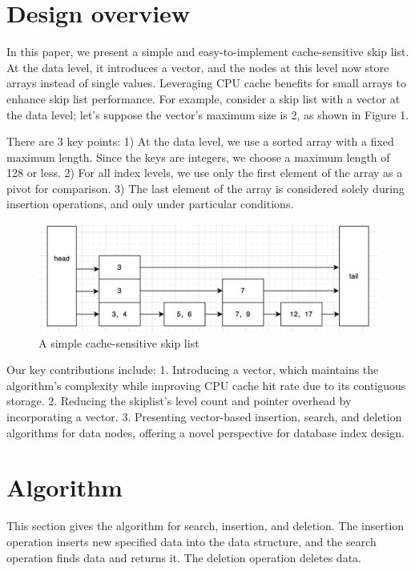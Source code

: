 \documentclass[sigconf, nonacm, letterpaper,top=2cm,bottom=2cm,left=3cm,right=3cm,marginparwidth=1.75cm]{acmart}
\begin{document}
\section{Design overview}

In this paper, we present a simple and easy-to-implement cache-sensitive skip list. At the data level, it introduces a vector, and the nodes at this level now store arrays instead of single values. Leveraging CPU cache benefits for small arrays to enhance skip list performance. For example, consider a skip list with a vector at the data level; let's suppose the vector's maximum size is 2, as shown in Figure 1. 

There are 3 key points: 1) At the data level, we use a sorted array with a fixed maximum length. Since the keys are integers, we choose a maximum length of 128 or less. 2) For all index levels, we use only the first element of the array as a pivot for comparison. 3) The last element of the array is considered solely during insertion operations, and only under particular conditions.

\begin{figure}
  \centering
  \includegraphics[width=\linewidth]{figures/skiplist.png}
\caption{A simple cache-sensitive skip list}
  \label{fig:skiplist}
\end{figure}

Our key contributions include: 1. Introducing a vector, which maintains the algorithm's complexity while improving CPU cache hit rate due to its contiguous storage. 2. Reducing the skiplist's level count and pointer overhead by incorporating a vector. 3. Presenting vector-based insertion, search, and deletion algorithms for data nodes, offering a novel perspective for database index design.

\section{Algorithm}
This section gives the algorithm for search, insertion, and deletion. The insertion operation inserts new specified data into the data structure, and the search operation finds data and returns it. The deletion operation deletes data. 
\end{document}
